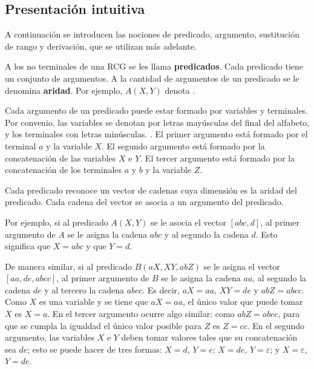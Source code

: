 \documentclass{report}
\theoremstyle{definition}
\theoremstyle{plain}
\theoremstyle{remark}
\begin{document}
\subsection{Presentación intuitiva}

 A continuación se introducen las nociones de predicado, argumento,
sustitución de rango y derivación, que se utilizan más adelante.

A los no terminales de una RCG se les llama \textbf{predicados}. Cada
predicado tiene un conjunto de argumentos. A la cantidad de argumentos
de un predicado se le denomina \textbf{aridad}. Por ejemplo, $A(X, Y)$
denota .

Cada argumento de un predicado puede estar formado por variables y
terminales. Por convenio, las variables se denotan por letras mayúsculas
del final del alfabeto, y los terminales con letras minúsculas. . El primer
argumento está formado por el terminal $a$ y la variable $X$. El
segundo argumento está formado por la concatenación de las variables
$X$ e $Y$. El tercer argumento está formado por la concatenación de los
terminales $a$ y $b$ y la variable $Z$.

Cada predicado reconoce un vector de cadenas cuya dimensión es la
aridad del predicado. Cada cadena del vector se asocia a un argumento
del predicado.

Por ejemplo, si al predicado $A(X, Y)$ se le asocia el vector $[abc,
      d]$, al primer argumento de $A$ se le asigna la cadena $abc$ y al
segundo la cadena $d$. Esto significa que $X = abc$ y que $Y = d$.

De manera similar, si al predicado $B(aX, XY, abZ)$ se le asigna el
vector $[aa, de, abcc]$, al primer argumento de $B$ se le asigna la
cadena $aa$, al segundo la cadena $de$ y al tercero la cadena $abcc$.
Es decir, $aX = aa$, $XY = de$ y $abZ = abcc$. Como $X$ es una variable
y se tiene que $aX = aa$, el único valor que puede tomar $X$ es $X = a$.
En el tercer argumento ocurre algo similar: como $abZ = abcc$, para que
se cumpla la igualdad el único valor posible para $Z$ es $Z = cc$. En el
segundo argumento, las variables $X$ e $Y$ deben tomar valores tales que
su concatenación sea $de$; esto se puede hacer de tres formas:
$X = d$, $Y = e$; $X = de$, $Y = \varepsilon$; y $X = \varepsilon$,
$Y = de$.
\end{document}
